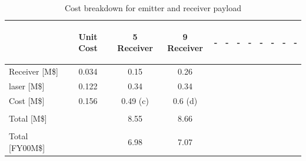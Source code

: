 \begin{table}[ht!]
\begin{tabular}{p{0.7in}|cccccccccc||c}
&\begin{sideways}Unit Cost\end{sideways} 
&\begin{sideways}5 Receiver\end{sideways} 
&\begin{sideways}9 Receiver\end{sideways} 
&\begin{sideways}-\end{sideways} 
&\begin{sideways}-\end{sideways}
&\begin{sideways}-\end{sideways} 
&\begin{sideways}-\end{sideways} 
&\begin{sideways}-\end{sideways} 
&\begin{sideways}-\end{sideways} 
&\begin{sideways}-\end{sideways}
&\begin{sideways}-\end{sideways}\\\hline
Receiver [M\$] &0.034 &0.15 &0.26 & & & & & & & & \\
\acs{laser} [M\$] &0.122 &0.34 &0.34 & & & & & & & & \\\hline\hline
Cost [M\$] &0.156 &0.49 (c) &0.6 (d) & & & & & & & &\\\hline\hline\\
Total [M\$] & &8.55 &8.66 & & & & & & & &\\\hline\\
Total [FY00M\$] & &6.98 &7.07 & & & & & & & &\\
\end{tabular}
\caption{Cost breakdown for emitter and receiver payload}
\label{tab:cost_payload}
\end{table}
